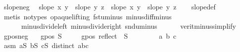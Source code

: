 \begin{isabellebody}
%
\endisadelimproof
\isanewline
{}\isamarkupfalse%
\ slope{\isacharunderscore}{\kern0pt}neg{\isacharcolon}{\kern0pt}\isanewline
\ \ {\isachardoublequoteopen}slope\ x\ y\ {\isacharless}{\kern0pt}\ slope\ y\ z\ {\isasymLongrightarrow}\ slope\ {\isacharparenleft}{\kern0pt}{\isacharminus}{\kern0pt}x{\isacharparenright}{\kern0pt}\ {\isacharparenleft}{\kern0pt}{\isacharminus}{\kern0pt}y{\isacharparenright}{\kern0pt}\ {\isacharless}{\kern0pt}\ slope\ {\isacharparenleft}{\kern0pt}{\isacharminus}{\kern0pt}y{\isacharparenright}{\kern0pt}\ {\isacharparenleft}{\kern0pt}{\isacharminus}{\kern0pt}z{\isacharparenright}{\kern0pt}{\isachardoublequoteclose}\isanewline
%
\isadelimproof
\ \ %
\endisadelimproof
%
\isatagproof
{}\isamarkupfalse%
\ slope{\isacharunderscore}{\kern0pt}def\isanewline
\ \ \isamarkupfalse%
\ {\isacharparenleft}{\kern0pt}metis\ {\isacharparenleft}{\kern0pt}no{\isacharunderscore}{\kern0pt}types{\isacharcomma}{\kern0pt}\ opaque{\isacharunderscore}{\kern0pt}lifting{\isacharparenright}{\kern0pt}\ fst{\isacharunderscore}{\kern0pt}uminus\ minus{\isacharunderscore}{\kern0pt}diff{\isacharunderscore}{\kern0pt}minus\isanewline
\ \ \ \ \ \ minus{\isacharunderscore}{\kern0pt}divide{\isacharunderscore}{\kern0pt}left\ minus{\isacharunderscore}{\kern0pt}divide{\isacharunderscore}{\kern0pt}right\ snd{\isacharunderscore}{\kern0pt}uminus\isanewline
\ \ \ \ \ \ verit{\isacharunderscore}{\kern0pt}minus{\isacharunderscore}{\kern0pt}simplify{\isacharparenleft}{\kern0pt}{}{\isacharparenright}{\kern0pt}{\isacharparenright}{\kern0pt}%
\endisatagproof
{\isafoldproof}%
%
\isadelimproof
\isanewline
%
\endisadelimproof
\isanewline
{}\isamarkupfalse%
\ gpos{\isacharunderscore}{\kern0pt}neg{\isacharcolon}{\kern0pt}\isanewline
\ \ \ {\isachardoublequoteopen}gpos\ S{\isachardoublequoteclose}\isanewline
\ \ \ \ \ {\isachardoublequoteopen}gpos\ {\isacharparenleft}{\kern0pt}reflect\ {\isacharbackquote}{\kern0pt}\ S{\isacharparenright}{\kern0pt}{\isachardoublequoteclose}\isanewline
%
\isadelimproof
%
\endisadelimproof
%
\isatagproof
{}\isamarkupfalse%
{\isacharminus}{\kern0pt}\isanewline
\ \ \isakeywordONE{{\isacharbraceleft}{\kern0pt}}\isamarkupfalse%
\isanewline
\ \ \ \ \isamarkupfalse%
\ a\ b\ c\isanewline
\ \ \ \ \isamarkupfalse%
\ asm{\isacharcolon}{\kern0pt}\ {\isachardoublequoteopen}a{\isasymin}S{\isachardoublequoteclose}\ {\isachardoublequoteopen}b{\isasymin}S{\isachardoublequoteclose}\ {\isachardoublequoteopen}c{\isasymin}S{\isachardoublequoteclose}\ {\isachardoublequoteopen}distinct\ {\isacharbrackleft}{\kern0pt}a{\isacharcomma}{\kern0pt}b{\isacharcomma}{\kern0pt}c{\isacharbrackright}{\kern0pt}{\isachardoublequoteclose}\isanewline

\end{isabellebody}
